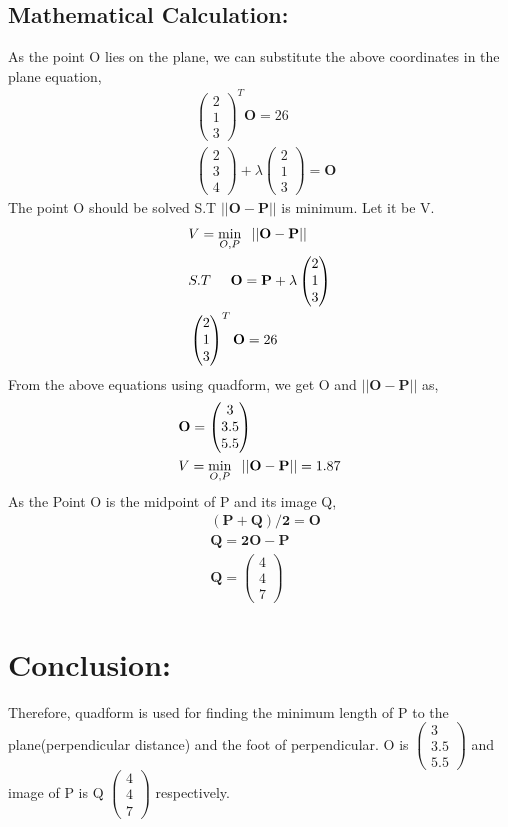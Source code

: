 \documentclass[a4paper,12pt,twocolumn]{article}
\let\vec\mathbf
\newcommand{\myvec}[1]{\ensuremath{\begin{pmatrix}#1\end{pmatrix}}}
\begin{document}
\subsection{Mathematical Calculation:}
As the point O lies on the plane, we can substitute the above coordinates in the plane equation,
\begin{align}
	&\myvec{2\\1\\3}^T\vec{O} = 26\\
	&\myvec{2\\3\\4}+\lambda\myvec{2\\1\\3} = \vec{O}
\end{align}
The point O should be solved S.T $||\vec{O-P}||$ is minimum. Let it be V.
\begin{align}
	&V = \min\limits_{O,P} \hspace{0.2cm} ||\vec{O-P}||\\
	&S.T \hspace{0.5cm} \vec{O} = \vec{P}+\lambda\myvec{2\\1\\3}\\
	& \myvec{2\\1\\3}^T\vec{O} = 26\\
\end{align}
From the above equations using quadform, we get O and $||\vec{O-P}||$ as,
\begin{align}
	&\vec{O} = \myvec{3\\3.5\\5.5}\\
&V = \min\limits_{O,P} \hspace{0.2cm}||\vec{O-P}|| = 1.87\\
\end{align}
As the Point O is the midpoint of P and its image Q,
\begin{align}
	&\vec{(P+Q)/2} = \vec{O}\\
	&\vec{Q} = \vec{2O-P}\\
	&\vec{Q} = \myvec{4\\4\\7}
\end{align}
\section{Conclusion:}
Therefore, quadform is used for finding the minimum length of P to the plane(perpendicular distance) and the foot of perpendicular. O is $\myvec{3\\3.5\\5.5}$ and image of P is Q $\myvec{4\\4\\7}$ respectively.
\end{document}
